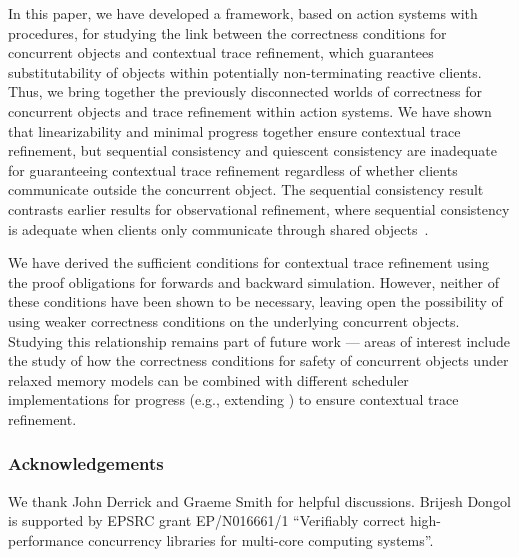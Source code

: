 \documentclass[11pt]{llncs}
\begin{document}
In this paper, we have developed a framework, based on action systems
with procedures, for studying the link between the correctness
conditions for concurrent objects and contextual trace refinement,
which guarantees substitutability of objects within potentially
non-terminating reactive clients. Thus, we bring together the
previously disconnected worlds of correctness for concurrent objects
and trace refinement within action systems. We have shown that
linearizability and minimal progress together ensure contextual trace
refinement, but sequential consistency and quiescent consistency are
inadequate for guaranteeing contextual trace refinement regardless of
whether clients communicate outside the concurrent object. The
sequential consistency result contrasts earlier results for
observational refinement, where sequential consistency is adequate
when clients only communicate through shared objects~\cite{FORY10}.







We have derived the sufficient conditions for contextual trace
refinement using the proof obligations for forwards and backward
simulation. However, neither of these conditions have been shown to be
necessary, leaving open the possibility of using weaker correctness
conditions on the underlying concurrent objects.  Studying this
relationship remains part of future work --- areas of interest include
the study of how the correctness conditions for safety of concurrent
objects under relaxed memory models \cite{DDGS15-ECOOP} can be
combined with different scheduler implementations for progress (e.g.,
extending \cite{LiangHFS13,HS11}) to ensure contextual trace
refinement. 





























\subsubsection*{Acknowledgements}
We thank John Derrick and Graeme Smith for helpful discussions.
Brijesh Dongol is supported by EPSRC grant EP/N016661/1 ``Verifiably
correct high-performance concurrency libraries for multi-core
computing systems''.





\end{document}
